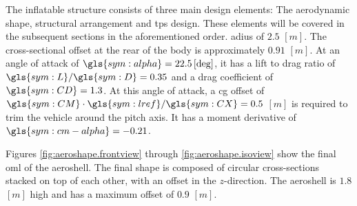 The inflatable structure consists of three main design elements: The aerodynamic shape, structural arrangement and \gls{tps} design. These elements will be covered in the subsequent sections in the aforementioned order.
adius of $2.5$ $\left[m\right]$. The cross-sectional offset at the rear of the body is approximately $0.91$ $\left[m\right]$. At an angle of attack of $\gls{sym:alpha} = 22.5 \left[\deg\right]$, it has a lift to drag ratio of $\gls{sym:L}/\gls{sym:D} = 0.35$ and a drag coefficient of $\gls{sym:CD} = 1.3$. At this angle of attack, a \gls{cg} offset of $\gls{sym:CM}\cdot \gls{sym:lref}/\gls{sym:CX} = 0.5$ $\left[m\right]$ is required to trim the vehicle around the pitch axis. It has a moment derivative of $\gls{sym:cm-alpha} = -0.21$. 
 
 Figures \ref{fig:aeroshape.frontview} through \ref{fig:aeroshape.isoview} show the final \gls{oml} of the aeroshell. The final shape is composed of circular cross-sections stacked on top of each other, with an offset in the $z$-direction. The aeroshell is $1.8$ $\left[m\right]$ high and has a maximum offset of $0.9$ $\left[m\right]$.
 
